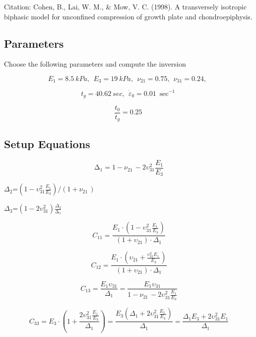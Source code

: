 \documentclass[
]{article}
\author{}
\date{}
\begin{document}
Citation: Cohen, B., Lai, W. M., \& Mow, V. C. (1998). A transversely
isotropic biphasic model for unconfined compression of growth plate and
chondroepiphysis.

\hypertarget{section}{%
\subsection{}\label{section}}

\hypertarget{parameters}{%
\subsection{Parameters}\label{parameters}}

Choose the following parameters and compute the inversion

\[E_{1} = 8.5\ kPa,\ \ E_{3} = 19\ kPa,\ \ \nu_{21} = 0.75,\ \ \nu_{31} = 0.24,\ \ \]

\[t_{g} = 40.62\ sec,\ \ {\dot{\varepsilon}}_{0} = 0.01\ \sec^{- 1}\]

\[\frac{t_{0}}{t_{g}} = 0.25\ \]

\hypertarget{setup-equations}{%
\subsection{Setup Equations}\label{setup-equations}}

\[\mathrm{\Delta}_{1} = 1 - \nu_{21\ } - 2\upsilon_{31}^{2}\frac{E_{1}}{E_{3}}\]

\(\Delta_{2}\)=\(\left( 1 - \upsilon_{31}^{2}\frac{E_{1}}{E_{3}} \right)/(1 + \nu_{21\ })\)

\(\Delta_{3}\)=\((1 - 2\upsilon_{31}^{2})\frac{\Delta_{2}}{\mathrm{\Delta}_{1}}\)

\[C_{11} = \frac{E_{1} \cdot \left( 1 - \upsilon_{31}^{2}\frac{E_{1\ }}{E_{3}} \right)}{\left( 1 + \upsilon_{21} \right) \cdot \Delta_{1}}\]

\[C_{12} = \frac{E_{1} \cdot (\upsilon_{21} + \frac{\upsilon_{31}^{2}E_{1\ }}{E_{3}})}{\left( 1 + \upsilon_{21} \right) \cdot \Delta_{1}}\]

\[C_{13} = \frac{E_{1}\upsilon_{31}}{\Delta_{1}} = \frac{E_{1}\upsilon_{31}}{1 - \nu_{21\ } - 2\upsilon_{31}^{2}\frac{E_{1}}{E_{3}}}\]

\[C_{33} = E_{3} \cdot \left( 1 + \frac{2\upsilon_{31}^{2}\frac{E_{1\ }}{E_{3}}}{\Delta_{1}} \right) = \frac{E_{3}\left( \Delta_{1} + 2\upsilon_{31}^{2}\frac{E_{1\ }}{E_{3}} \right)}{\Delta_{1}} = \frac{\Delta_{1}E_{3} + 2\upsilon_{31}^{2}E_{1}}{\Delta_{1}}\]
\end{document}
